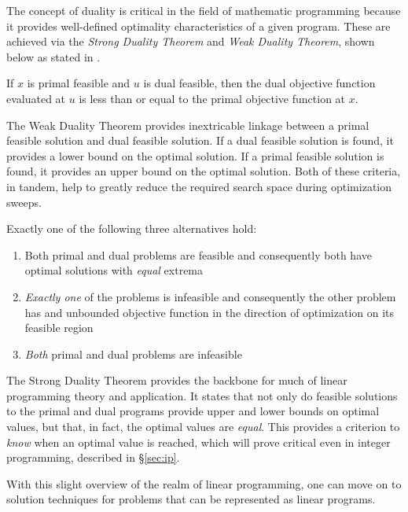 The concept of duality is critical in the field of mathematic programming
because it provides well-defined optimality characteristics of a given
program. These are achieved via the \textit{Strong Duality Theorem}
and \textit{Weak Duality Theorem}, shown below as stated
in \cite{ferris_linear_2008}.

\begin{thm}
If $x$ is primal feasible and $u$ is dual feasible, then the dual objective
function evaluated at $u$ is less than or equal to the primal objective function
at $x$.
\end{thm}

The Weak Duality Theorem provides inextricable linkage between a primal feasible
solution and dual feasible solution. If a dual feasible solution is found, it
provides a lower bound on the optimal solution. If a primal feasible solution is
found, it provides an upper bound on the optimal solution. Both of these
criteria, in tandem, help to greatly reduce the required search space during
optimization sweeps.

\begin{thm}
Exactly one of the following three alternatives hold:
\begin{enumerate}

  \item Both primal and dual problems are feasible and consequently both have
  optimal solutions with \textit{equal} extrema

  \item \textit{Exactly one} of the problems is infeasible and consequently the
  other problem has and unbounded objective function in the direction of
  optimization on its feasible region

  \item \textit{Both} primal and dual problems are infeasible

\end{enumerate}
\end{thm}

The Strong Duality Theorem provides the backbone for much of linear programming
theory and application. It states that not only do feasible solutions to the
primal and dual programs provide upper and lower bounds on optimal values, but
that, in fact, the optimal values are \textit{equal}. This provides a criterion
to \textit{know} when an optimal value is reached, which will prove critical
even in integer programming, described in \S \ref{sec:ip}.

With this slight overview of the realm of linear programming, one can move on to
solution techniques for problems that can be represented as linear programs.
